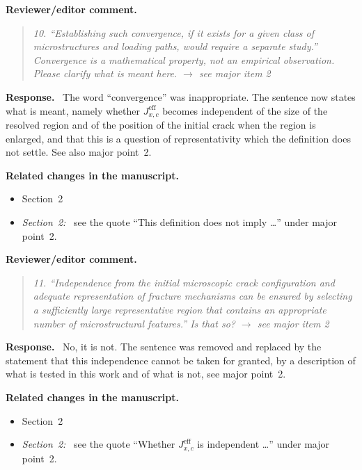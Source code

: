 \documentclass[pdflatex,sn-mathphys-num]{sn-jnl}
\newenvironment{reviewercomment}
  {\par\noindent\textbf{Reviewer/editor comment.}\begin{quote}\itshape}
  {\end{quote}}
\newenvironment{response}
  {\par\noindent\textbf{Response.}\ }
  {\par}
\newenvironment{relatedchanges}
  {\par\noindent\textbf{Related changes in the manuscript.}\begin{itemize}\small}
  {\end{itemize}}
\newcommand{\msloc}[1]{\textit{#1:}\ }
\newcommand{\relhead}[1]{\item[]\vspace*{0.2\baselineskip}#1}
\begin{document}
\begin{reviewercomment}
10. ``Establishing such convergence, if it exists for a given class of microstructures and loading paths, would require
a separate study.'' Convergence is a mathematical property, not an empirical observation. Please clarify what is meant
here. $\to$ see major item 2
\end{reviewercomment}
\begin{response}
The word ``convergence'' was inappropriate. The sentence now states what is meant, namely whether $J_{x,c}^{\text{eff}}$ becomes independent of the size of the resolved region and of the position of the initial crack when the region is enlarged, and that this is a question of representativity which the definition does not settle. See also major point~2.
\end{response}
\begin{relatedchanges}
\relhead{Section~2}
\item \msloc{Section~2} see the quote ``This definition does not imply \dots'' under major point~2.
\end{relatedchanges}

\begin{reviewercomment}
11. ``Independence from the initial microscopic crack configuration and adequate representation of fracture mechanisms
can be ensured by selecting a sufficiently large representative region that contains an appropriate number of
microstructural features.'' Is that so? $\to$ see major item 2
\end{reviewercomment}
\begin{response}
No, it is not. The sentence was removed and replaced by the statement that this independence cannot be taken for granted, by a description of what is tested in this work and of what is not, see major point~2.
\end{response}
\begin{relatedchanges}
\relhead{Section~2}
\item \msloc{Section~2} see the quote ``Whether $J_{x,c}^{\text{eff}}$ is independent \dots'' under major point~2.
\end{relatedchanges}
\end{document}
